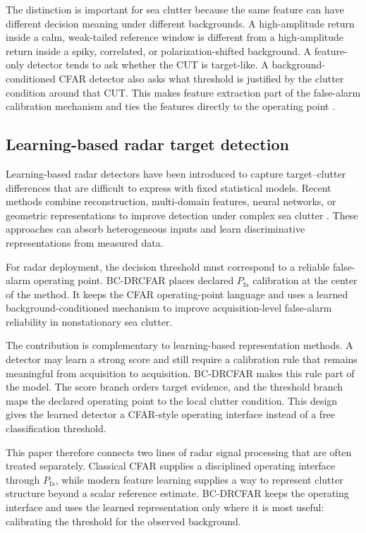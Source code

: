 \documentclass[preprint,12pt]{elsarticle}
\begin{document}
The distinction is important for sea clutter because the same feature can have
different decision meaning under different backgrounds. A high-amplitude return
inside a calm, weak-tailed reference window is different from a high-amplitude
return inside a spiky, correlated, or polarization-shifted background. A
feature-only detector tends to ask whether the CUT is target-like. A
background-conditioned CFAR detector also asks what threshold is justified by
the clutter condition around that CUT. This makes feature extraction part of the
false-alarm calibration mechanism and ties the features directly to the
operating point \cite{luo2022lowobservable,guan2024nonlinear,yang2017polarization}.

\subsection{Learning-based radar target detection}

Learning-based radar detectors have been introduced to capture target--clutter
differences that are difficult to express with fixed statistical models.
Recent methods combine reconstruction, multi-domain features, neural networks,
or geometric representations to improve detection under complex sea clutter
\cite{liang2022unsupervised,wang2023sala,wang2024triplechannel,wang2025twostage,chen2025multidomain,chen2026mspmig,bai2026complexvae}.
These approaches can absorb
heterogeneous inputs and learn discriminative representations from measured
data.

For radar deployment, the decision threshold must correspond to a reliable
false-alarm operating point. BC-DRCFAR places declared $P_{\mathrm{fa}}$
calibration at the center of the method. It keeps the CFAR operating-point
language and uses a learned background-conditioned mechanism to improve
acquisition-level false-alarm reliability in nonstationary sea clutter.

The contribution is complementary to learning-based representation methods. A
detector may learn a strong score and still require a calibration rule that
remains meaningful from acquisition to acquisition. BC-DRCFAR makes this rule
part of the model. The score branch orders target evidence, and the threshold
branch maps the declared operating point to the local clutter condition. This
design gives the learned detector a CFAR-style operating interface instead of a
free classification threshold.

This paper therefore connects two lines of radar signal processing that are
often treated separately. Classical CFAR supplies a disciplined operating
interface through $P_{\mathrm{fa}}$, while modern feature learning supplies a
way to represent clutter structure beyond a scalar reference estimate.
BC-DRCFAR keeps the operating interface and uses the learned representation only
where it is most useful: calibrating the threshold for the observed background.
\end{document}
